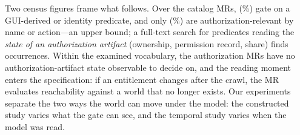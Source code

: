 Two census figures frame what follows. Over the \ResCatalogMrTotal{} catalog
MRs, \ResCatalogGuiDerived{} (\ResCatalogGuiDerivedPct{}\%) gate on a
GUI-derived or identity predicate, and only \ResCatalogUnion{}
(\ResCatalogUnionPct{}\%) are authorization-relevant by name or action---an
upper bound; a full-text search for predicates reading the \emph{state of an
authorization artifact} (ownership, permission record, share) finds
\ResCatalogAuthzStateHits{} occurrences. Within the examined vocabulary, the
authorization MRs have no authorization-artifact state observable to decide on,
and the reading moment enters the specification: if an entitlement changes after
the crawl, the MR evaluates reachability against a world that no longer exists.
Our experiments separate the two ways the world can move under the model: the
constructed study varies what the gate can see, and the temporal study varies
when the model was read.
